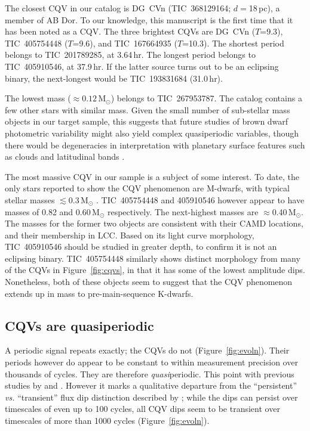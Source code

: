 \documentclass[11pt,twocolumn,tighten]{aastex63}
\begin{document}
The closest CQV in our catalog is DG~CVn (TIC~368129164;
$d$$=$18\,pc), a member of AB Dor.  To our knowledge, this manuscript
is the first time that it has been noted as a CQV.  The three
brightest CQVs are DG~CVn ($T$=9.3), TIC~405754448 ($T$=9.6), and
TIC~167664935 ($T$=10.3).  The shortest period belongs to
TIC~201789285, at 3.64\,hr.  The longest period belongs to
TIC~405910546, at 37.9\,hr.  If the latter source turns out to be an
eclipsing binary, the next-longest would be TIC~193831684 (31.0\,hr).

The lowest mass ($\approx 0.12$\,M$_\odot$) belongs to TIC~267953787.
The catalog contains a few other stars with similar mass.  Given the
small number of sub-stellar mass objects in our target sample, this
suggests that future studies of brown dwarf photometric variability
might also yield complex quasiperiodic variables, though there would
be degeneracies in interpretation with planetary surface features such
as clouds and latitudinal bands
\citep[e.g.][]{2021ApJ...906...64A,2022ApJ...924...68V}.

The most massive CQV in our sample is a subject of some interest.  To
date, the only stars reported to show the CQV phenomenon are M-dwarfs,
with typical stellar masses $\lesssim$0.3\,M$_\odot$
\citep{2022AJ....163..144G}.  TIC~405754448 and 405910546 however
appear to have masses of 0.82 and 0.60\,M$_\odot$ respectively.  The
next-highest masses are $\approx$0.40\,M$_\odot$.  The masses for the
former two objects are consistent with their CAMD locations, and their
membership in LCC.  Based on its light curve morphology, TIC~405910546
should be studied in greater depth, to confirm it is not an eclipsing
binary.  TIC~405754448 similarly shows distinct morphology from many
of the CQVs in Figure~\ref{fig:cqvs}, in that it has some of the
lowest amplitude dips.  Nonetheless, both of these objects seem to
suggest that the CQV phenomenon extends up in mass to
pre-main-sequence K-dwarfs.


\subsection{CQVs are quasiperiodic}
A periodic signal repeats exactly; the CQVs do not
(Figure~\ref{fig:evoln}).  Their periods however do appear to be
constant to within measurement precision over thousands of cycles.
They are therefore {\it quasi}periodic.  This point with previous
studies by \citet{2022AJ....163..144G} and
\citet{2023ApJ...945..114P}.  However it marks a qualitative departure
from the ``persistent'' {\it vs.} ``transient'' flux dip distinction
described by \citet{2017AJ....153..152S};  while the dips can persist
over timescales of even up to 100 cycles, all CQV dips seem to be
transient over timescales of more than 1000 cycles
(Figure~\ref{fig:evoln}).
\end{document}
